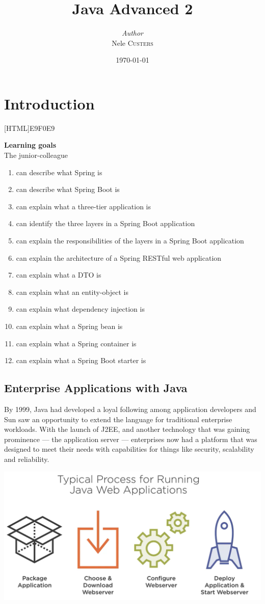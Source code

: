 \documentclass[a4paper, 12pt]{report}
\institute{Hogeschool PXL}
\title{Java Advanced 2}
\author{\textit{Author}\\Nele \textsc{Custers}}
\date{\today}
\begin{document}
    \maketitle
    \romantableofcontents
    
 

\chapter{Introduction}
    
[HTML]{E9F0E9}{\parbox{\textwidth}{%
\noindent \textbf{Learning goals}\\
The junior-colleague
\begin{enumerate}[nolistsep]
\item can describe what Spring is
\item can describe what Spring Boot is
\item can explain what a three-tier application is
\item can identify the three layers in a Spring Boot application
\item can explain the responsibilities of the layers in a Spring Boot application
\item can explain the architecture of a Spring RESTful web application
\item can explain what a DTO is
\item can explain what an entity-object is
\item can explain what dependency injection is
\item can explain what a Spring bean is
\item can explain what a Spring container is
\item can explain what a Spring Boot starter is
\end{enumerate}}}


\section{Enterprise Applications with Java}
By 1999, Java had developed a loyal following among application developers and Sun saw an opportunity to extend the language for traditional enterprise workloads. With the launch of J2EE, and another technology that was gaining prominence — the application server — enterprises now had a platform that was designed to meet their needs with capabilities for things like security, scalability and reliability.

\includegraphics[width=\textwidth]{./images/chapter1/before_spring_boot.png} 
\end{document}
